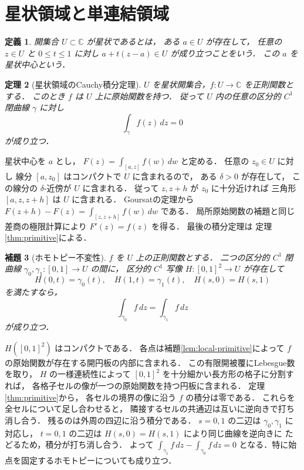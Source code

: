 \documentclass[a5paper,10pt,onecolumn]{jsarticle}
\makeatletter
\theoremstyle{mathnotetheorem}
\newtheorem{theorem}{定理}[section]
\newtheorem{definition}[theorem]{定義}
\newtheorem{lemma}[theorem]{補題}
\renewcommand{\proofname}{証明}
\renewenvironment{proof}[1][\proofname]{%
  \par\pushQED{\qed}\normalfont\topsep4\p@\@plus2\p@\relax
  \trivlist\item[\hskip\labelsep\bfseries #1]\ignorespaces
}{\popQED\endtrivlist\@endpefalse}
\makeatother
\begin{document}
\section{星状領域と単連結領域}

\begin{definition}
開集合 $U\subset\mathbb C$ が\emph{星状}であるとは，
ある $a\in U$ が存在して，
任意の $z\in U$ と $0\le t\le1$ に対し
$a+t(z-a)\in U$ が成り立つことをいう．
この $a$ を星状中心という．
\end{definition}

\begin{theorem}[星状領域のCauchy積分定理]\label{thm:star-shaped}
$U$ を星状開集合，$f:U\to\mathbb C$ を正則関数とする．
このとき $f$ は $U$ 上に原始関数を持つ．
従って $U$ 内の任意の区分的 $C^1$ 閉曲線 $\gamma$ に対し
\[
 \int_\gamma f(z)\,dz=0
\]
が成り立つ．
\end{theorem}
\begin{proof}
星状中心を $a$ とし，
$F(z)=\int_{[a,z]}f(w)\,dw$ と定める．
任意の $z_0\in U$ に対し
線分 $[a,z_0]$ はコンパクトで $U$ に含まれるので，
ある $\delta>0$ が存在して，
この線分の $\delta$-近傍が $U$ に含まれる．
従って $z,z+h$ が $z_0$ に十分近ければ
三角形 $[a,z,z+h]$ は $U$ に含まれる．
Goursatの定理から
$F(z+h)-F(z)=\int_{[z,z+h]}f(w)\,dw$ である．
局所原始関数の補題と同じ差商の極限計算により
$F'(z)=f(z)$ を得る．
最後の積分定理は
定理\ref{thm:primitive}による．
\end{proof}

\begin{lemma}[ホモトピー不変性]\label{lem:homotopy}
$f$ を $U$ 上の正則関数とする．
二つの区分的 $C^1$ 閉曲線
$\gamma_0,\gamma_1:[0,1]\to U$ の間に，
区分的 $C^1$ 写像 $H:[0,1]^2\to U$ が存在して
\[
 H(0,t)=\gamma_0(t),\quad H(1,t)=\gamma_1(t),
 \quad H(s,0)=H(s,1)
\]
を満たすなら，
\[
 \int_{\gamma_0}f\,dz=\int_{\gamma_1}f\,dz
\]
が成り立つ．
\end{lemma}
\begin{proof}
$H([0,1]^2)$ はコンパクトである．
各点は補題\ref{lem:local-primitive}によって
$f$ の原始関数が存在する開円板の内部に含まれる．
この有限開被覆にLebesgue数を取り，
$H$ の一様連続性によって
$[0,1]^2$ を十分細かい長方形の格子に分割すれば，
各格子セルの像が一つの原始関数を持つ円板に含まれる．
定理\ref{thm:primitive}から，
各セルの境界の像に沿う $f$ の積分は零である．
これらを全セルについて足し合わせると，
隣接するセルの共通辺は互いに逆向きで打ち消し合う．
残るのは外周の四辺に沿う積分である．
$s=0,1$ の二辺は $\gamma_0,\gamma_1$ に対応し，
$t=0,1$ の二辺は
$H(s,0)=H(s,1)$ により同じ曲線を逆向きに
たどるため，積分が打ち消し合う．
よって $\int_{\gamma_1}f\,dz-\int_{\gamma_0}f\,dz=0$
となる．特に始点を固定するホモトピーについても成り立つ．
\end{proof}
\end{document}
